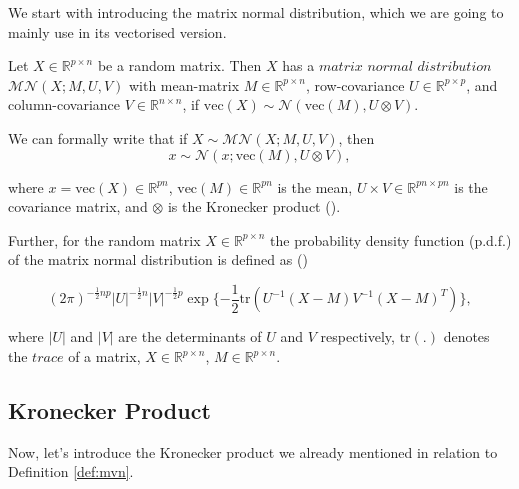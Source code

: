 \documentclass{mldsmsc}
\begin{document}
We start with introducing the matrix normal distribution, which we are going to mainly use in its vectorised version.

\begin{definition} \label{def:mvn}
    Let $X \in \mathbb{R}^{p \times n}$ be a random matrix. Then $X$ has a $\textit{matrix normal distribution}$ $\mathcal{MN}(X; M, U, V)$ with mean-matrix $M \in \mathbb{R}^{p \times n}$, row-covariance $U \in \mathbb{R}^{p \times p}$, and column-covariance $V \in \mathbb{R}^{n \times n}$, if $\text{vec}(X) \sim \mathcal{N}(\text{vec}(M), U \otimes V)$.
\end{definition}

\noindent We can formally write that if $X \sim \mathcal{MN}(X; M, U, V)$, then 
\begin{equation} \label{eq:mndvec}
    x \sim \mathcal{N}(x; \text{vec}(M), U \otimes V),
\end{equation}

\noindent where $x = \text{vec}(X) \in \mathbb{R}^{pn}$, $\text{vec}(M) \in \mathbb{R}^{pn}$ is the mean, $U \times V \in \mathbb{R}^{pn \times pn}$ is the covariance matrix, and $\otimes$ is the Kronecker product (\cite{gupta}). \newline

\noindent Further, for the random matrix $X \in \mathbb{R}^{p \times n}$ the probability density function (p.d.f.) of the matrix normal distribution is defined as (\cite{gupta})

\begin{equation}
    (2\pi)^{-\frac{1}{2}np} |U|^{-\frac{1}{2}n} |V|^{-\frac{1}{2}p} \exp{\{-\frac{1}{2}\text{tr}(U^{-1}(X - M)V^{-1}(X - M)^{T})\}},
\end{equation}

\noindent where $|U|$ and $|V|$ are the determinants of $U$ and $V$ respectively, $\text{tr}(.)$ denotes the $\textit{trace}$ of a matrix, $X \in \mathbb{R}^{p \times n}$, $M \in \mathbb{R}^{p \times n}$.

\subsection{Kronecker Product}

Now, let's introduce the Kronecker product we already mentioned in relation to Definition \ref{def:mvn}.
\end{document}
